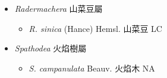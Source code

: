 
  \begin{itemize}
 \item[] \textit{Radermachera} 山菜豆屬
                                
  \begin{itemize}
        \item[] \textit{R. sinica} (Hance) Hemsl.  山菜豆   LC
  \end{itemize}
 \item[] \textit{Spathodea} 火焰樹屬
                                
  \begin{itemize}
        \item[] \textit{S. campanulata} Beauv.  火焰木   NA
  \end{itemize}
  \end{itemize}
